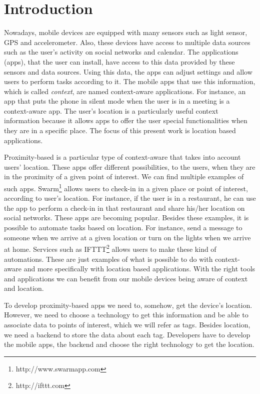
\section{Introduction}
\label{sec:introduction}
Nowadays, mobile devices are equipped with many sensors such as light sensor, \gls{GPS} and accelerometer.
Also, these devices have access to multiple data sources such as
the user's activity on social networks and calendar.
The applications (apps), that the user can install, have access to this data provided by these sensors and data sources.
Using this data, the apps can adjust settings and allow users to perform tasks according to it.
The mobile apps that use this information, which is called \emph{context}, are named context-aware applications.
For instance, an app that puts the phone in silent mode when the user is in a meeting is a context-aware app.
The user's location is a particularly useful context information because it allows apps to offer the user special functionalities when they are in a specific place.
The focus of this present work is location based applications.

Proximity-based is a particular type of context-aware that takes into account users' location.
These apps offer different possibilities, to the users, when they are in the proximity of a given point of interest.
We can find multiple examples of such apps.
Swarm\footnote{http://www.swarmapp.com} allows users to check-in in a given place or point of interest, according to user's location.
For instance, if the user is in a restaurant, he can use the app to perform a check-in in that restaurant and share his/her location on social networks.
These apps are becoming popular.
Besides these examples, it is possible to automate tasks based on location.
For instance, send a message to someone when we arrive at a given location or turn on the lights when we arrive at home.
Services such as \gls{IFTTT}\footnote{http://ifttt.com} allows users to make these kind of automations.
These are just examples of what is possible to do with context-aware and more specifically with location based applications.
With the right tools and applications we can benefit from our mobile devices being aware of context and location.

To develop proximity-based apps we need to, somehow, get the device's location.
However, we need to choose a technology to get this information and be able to associate data to points of interest, which we will refer as tags.
Besides location, we need a backend to store the data about each tag.
Developers have to develop the mobile apps, the backend and choose the right technology to get the location.

